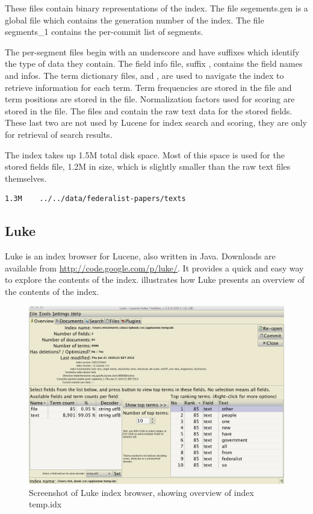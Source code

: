 %
These files contain binary representations of the index.  
The file segements.gen is a global file which contains the generation number of the index.
The file segments\_1 contains the per-commit list of segments.

The per-segment files begin with an underscore and have suffixes
which identify the type of data they contain.
The field info file, suffix , contains the field names and infos.
The term dictionary files,  and , are used to navigate the index to
retrieve information for each term.
Term frequencies are stored in the  file
and term positions are stored in the  file.
Normalization factors used for scoring are stored in the  file.
The files  and  contain the raw text data for the stored fields.
These last two are not used by Lucene for index search and scoring, they are only
for retrieval of search results.

The index takes up 1.5M total disk space.
Most of this space is used for the stored fields file, 1.2M in size,
which is slightly smaller than the raw text files themselves.
\begin{verbatim}
1.3M	../../data/federalist-papers/texts
\end{verbatim}

\subsection{Luke}

Luke is an index browser for Lucene, also written in Java.
Downloads are available from \url{http://code.google.com/p/luke/}.
It provides a quick and easy way to explore the contents of the index.
 illustrates how Luke presents an overview
of the contents of the index.

\begin{figure}[!hb]
\includegraphics[width=5.0in]{pngs/luke1.png}
\vspace*{-18pt}
\caption{Screenshot of Luke index browser, showing overview of index temp.idx}\label{fig:luke-overview}
\end{figure}

